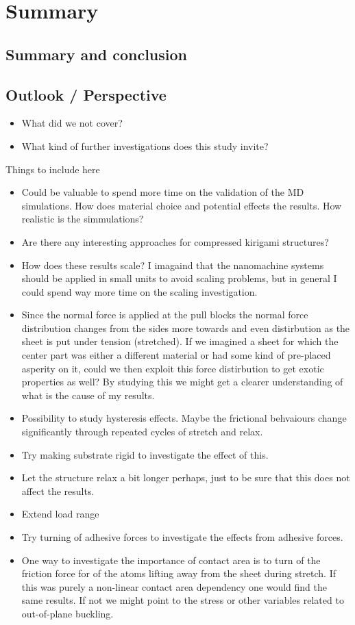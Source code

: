 \newpage
\chapter*{Summary}

\section{Summary and conclusion}

\section{Outlook / Perspective}

\begin{itemize}
  \item What did we not cover?
  \item What kind of further investigations does this study invite?
\end{itemize}


Things to include here
\begin{itemize}
  \item Could be valuable to spend more time on the validation of the MD simulations. How does material choice and potential effects the results. How realistic is the simmulations?
  \item Are there any interesting approaches for compressed kirigami structures?
  \item How does these results scale? I imagaind that the nanomachine systems should be applied in small units to avoid scaling problems, but in general I could spend way more time on the scaling investigation.
  \item Since the normal force is applied at the pull blocks the normal force distribution changes from the sides more towards and even distirbution as the sheet is put under tension (stretched). If we imagined a sheet for which the center part was either a different material or had some kind of pre-placed asperity on it, could we then exploit this force distirbution to get exotic properties as well? By studying this we might get a clearer understanding of what is the cause of my results. 
  \item Possibility to study hysteresis effects. Maybe the frictional behvaiours change significantly through repeated cycles of stretch and relax. 
  \item Try making substrate rigid to investigate the effect of this. 
  \item Let the structure relax a bit longer perhaps, just to be sure that this does not affect the results. 
  \item Extend load range
  \item Try turning of adhesive forces to investigate the effects from adhesive forces. 
  \item One way to investigate the importance of contact area is to turn of the friction force for of the atoms lifting away from the sheet during stretch. If this was purely a non-linear contact area dependency one would find the same results. If not we might point to the stress or other variables related to out-of-plane buckling.
\end{itemize}



